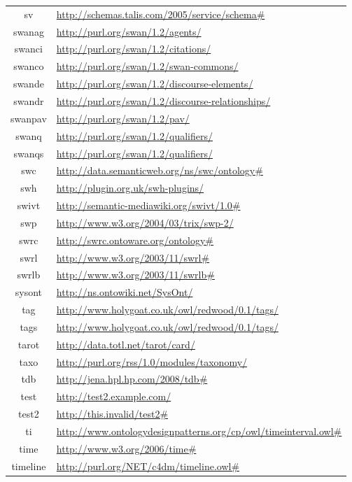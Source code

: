 \documentclass{article}
\begin{document}
\begin{longtable}{ c | p{8cm} }
		sv & \url{http://schemas.talis.com/2005/service/schema#} \\
		swanag & \url{http://purl.org/swan/1.2/agents/} \\
		swanci & \url{http://purl.org/swan/1.2/citations/} \\
		swanco & \url{http://purl.org/swan/1.2/swan-commons/} \\
		swande & \url{http://purl.org/swan/1.2/discourse-elements/} \\
		swandr & \url{http://purl.org/swan/1.2/discourse-relationships/} \\
		swanpav & \url{http://purl.org/swan/1.2/pav/} \\
		swanq & \url{http://purl.org/swan/1.2/qualifiers/} \\
		swanqs & \url{http://purl.org/swan/1.2/qualifiers/} \\
		swc & \url{http://data.semanticweb.org/ns/swc/ontology#} \\
		swh & \url{http://plugin.org.uk/swh-plugins/} \\
		swivt & \url{http://semantic-mediawiki.org/swivt/1.0#} \\
		swp & \url{http://www.w3.org/2004/03/trix/swp-2/} \\
		swrc & \url{http://swrc.ontoware.org/ontology#} \\
		swrl & \url{http://www.w3.org/2003/11/swrl#} \\
		swrlb & \url{http://www.w3.org/2003/11/swrlb#} \\
		sysont & \url{http://ns.ontowiki.net/SysOnt/} \\
		tag & \url{http://www.holygoat.co.uk/owl/redwood/0.1/tags/} \\
		tags & \url{http://www.holygoat.co.uk/owl/redwood/0.1/tags/} \\
		tarot & \url{http://data.totl.net/tarot/card/} \\
		taxo & \url{http://purl.org/rss/1.0/modules/taxonomy/} \\
		tdb & \url{http://jena.hpl.hp.com/2008/tdb#} \\
		test & \url{http://test2.example.com/} \\
		test2 & \url{http://this.invalid/test2#} \\
		ti & \url{http://www.ontologydesignpatterns.org/cp/owl/timeinterval.owl#} \\
		time & \url{http://www.w3.org/2006/time#} \\
		timeline & \url{http://purl.org/NET/c4dm/timeline.owl#} \\

\end{longtable}
\end{document}
